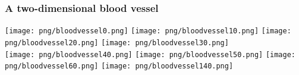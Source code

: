 \begin{frame}
  \frametitle{A two-dimensional blood vessel}

  \begin{center}
    \texttt{[image: png/bloodvessel0.png]}
    \texttt{[image: png/bloodvessel10.png]}
    \texttt{[image: png/bloodvessel20.png]}
    \texttt{[image: png/bloodvessel30.png]} \\
    \texttt{[image: png/bloodvessel40.png]}
    \texttt{[image: png/bloodvessel50.png]}
    \texttt{[image: png/bloodvessel60.png]}
    \texttt{[image: png/bloodvessel140.png]}
  \end{center}

\end{frame}
